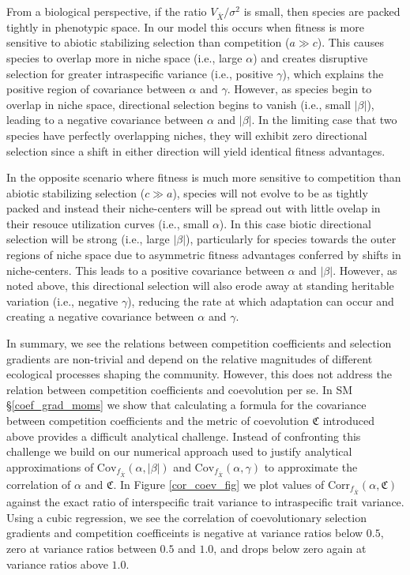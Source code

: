 \documentclass[]{article}
\begin{document}
From a biological perspective, if the ratio \(V_{\bar X}/\sigma^2\) is
small, then species are packed tightly in phenotypic space. In our model
this occurs when fitness is more sensitive to abiotic stabilizing
selection than competition (\(a\gg c\)). This causes species to overlap
more in niche space (i.e., large \(\alpha\)) and creates disruptive
selection for greater intraspecific variance (i.e., positive
\(\gamma\)), which explains the positive region of covariance between
\(\alpha\) and \(\gamma\). However, as species begin to overlap in niche
space, directional selection begins to vanish (i.e., small \(|\beta|\)),
leading to a negative covariance between \(\alpha\) and \(|\beta|\). In
the limiting case that two species have perfectly overlapping niches,
they will exhibit zero directional selection since a shift in either
direction will yield identical fitness advantages.

In the opposite scenario where fitness is much more sensitive to
competition than abiotic stabilizing selection (\(c\gg a\)), species
will not evolve to be as tightly packed and instead their niche-centers
will be spread out with little ovelap in their resouce utilization
curves (i.e., small \(\alpha\)). In this case biotic directional
selection will be strong (i.e., large \(|\beta|\)), particularly for
species towards the outer regions of niche space due to asymmetric
fitness advantages conferred by shifts in niche-centers. This leads to a
positive covariance between \(\alpha\) and \(|\beta|\). However, as
noted above, this directional selection will also erode away at standing
heritable variation (i.e., negative \(\gamma\)), reducing the rate at
which adaptation can occur and creating a negative covariance between
\(\alpha\) and \(\gamma\).

In summary, we see the relations between competition coefficients and
selection gradients are non-trivial and depend on the relative
magnitudes of different ecological processes shaping the community.
However, this does not address the relation between competition
coefficients and coevolution per se. In SM \S\ref{coef_grad_moms} we
show that calculating a formula for the covariance between competition
coefficients and the metric of coevolution \(\mathfrak{C}\) introduced
above provides a difficult analytical challenge. Instead of confronting
this challenge we build on our numerical approach used to justify
analytical approximations of
\(\mathrm{Cov}_{f_{\bar X}}(\alpha,|\beta|)\) and
\(\mathrm{Cov}_{f_{\bar X}}(\alpha,\gamma)\) to approximate the
correlation of \(\alpha\) and \(\mathfrak{C}\). In Figure
\ref{cor_coev_fig} we plot values of
\(\mathrm{Corr}_{f_{\bar X}}(\alpha,\mathfrak{C})\) against the exact
ratio of interspecific trait variance to intraspecific trait variance.
Using a cubic regression, we see the correlation of coevolutionary
selection gradients and competition coefficeints is negative at variance
ratios below \(0.5\), zero at variance ratios between \(0.5\) and
\(1.0\), and drops below zero again at variance ratios above \(1.0\).
\end{document}
